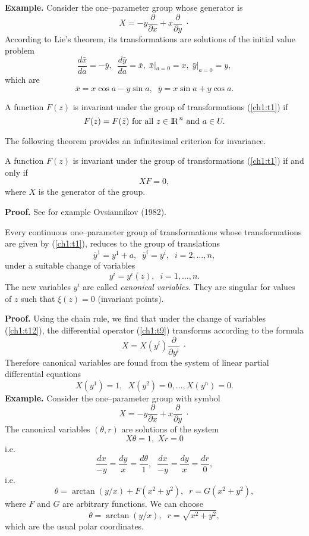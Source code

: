{\bf Example.} Consider the one--parameter group whose generator is
\[X=-y\frac{\partial}{\partial x}+ x \frac{\partial}{\partial y}\;\cdot\]
According to Lie's theorem, its transformations are solutions of the initial
value problem
\[ \frac{d\bar x}{da}=-\bar y,\;\; \frac{d\bar y}{da}=\bar x,\;\bar x|_{a=0}=x,\;
\bar y|_{a=0}=y,\]
which are
\[ \bar x=x\cos a-y\sin a,\;\; \bar y= x\sin a+ y\cos a .\]

\begin{defi}
\begin{em}
A function $F(z)$ is invariant under the group of transformations
(\ref{ch1:t1})
if
\[F(z)=F(\bar z) \mbox{ for all $z\in \mathrm{I\!R\!}^{\;n}$} \mbox{ and } a\in U.\]
\end{em}
\end{defi}
The following theorem provides an infinitesimal criterion for invariance.
\begin{theo}
\begin{em}
A function $F(z)$ is invariant under the group of transformations (\ref{ch1:t1})
if and only if
\[XF=0,\]
where  $X$ is the generator of the group.
\end{em}
\end{theo}
{\bf Proof.} See for example Ovsiannikov (1982).
\begin{theo}
\label{canv}
\begin{em}
Every continuous one--parameter group of transformations whose transformations
are given by (\ref{ch1:t1}), reduces to the group of translations
\begin{equation}
\label{ch1:t11}
\bar y^1=y^1+a,\;\;\bar y^i=y^i,\;\; i=2,\ldots,n,
\end{equation}
under a suitable change of variables
\begin{equation}
\label{ch1:t12}
y^i=y^i (z),\;\; i=1,\ldots,n.
\end{equation}
The new variables $y^i$ are called {\em canonical variables}. They are
singular
for values of $z$ such that $\xi (z)=0$ (invariant points).
\end{em}
\end{theo}
{\bf Proof.} Using the chain rule, we find that under the change of variables
(\ref{ch1:t12}), the differential
operator (\ref{ch1:t9}) transforms according to the formula
\[X=X(y^i)\frac{\partial}{\partial y^i}\; \cdot\]
Therefore canonical variables are found from the system of linear partial
differential equations
\[X(y^1)=1,\;\; X(y^2)=0,\ldots,X(y^n)=0.\]
{\bf Example.}  Consider the one--parameter group with symbol
\[X=-y\frac{\partial}{\partial x}+ x \frac{\partial}{\partial y}\; \cdot\]
The canonical variables $(\theta, r)$ are solutions of the system
\[X\theta =1,\;Xr=0\]
i.e.
\[\frac{dx}{-y}=\frac{dy}{x}=\frac{d\theta}{1},\;\;
  \frac{dx}{-y}=\frac{dy}{x}=\frac{dr}{0},\]
i.e.
\[\theta =\arctan (y/x)+F(x^2+y^2),\;\; r=G(x^2+y^2),\]
where $F$ and $G$ are arbitrary functions. We can choose 
\[\theta=\arctan (y/x),\;\;r=\sqrt{x^2+y^2},\]
which are the usual polar coordinates.

